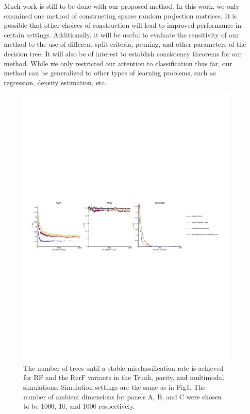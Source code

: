 \documentclass{article} %
\begin{document}
Much work is still to be done with our proposed method. In this work, we only examined one method of constructing sparse random projection matrices. It is possible that other choices of construction will lead to improved performance in certain settings. Additionally, it will be useful to evaluate the sensitivity of our method to the use of different split criteria, pruning, and other parameters of the decision tree. It will also be of interest to establish consistency theorems for our method. While we only restricted our attention to classification thus far, our method can be generalized to other types of learning problems, such as regression, density estimation, etc.




\appendix
\setcounter{figure}{0}
\renewcommand\thefigure{A\arabic{figure}}

\begin{figure}[h]
\begin{center}
\includegraphics[trim=0in 8in 0in 8in, clip=true, width=\linewidth]{../Figures/pdf/Fig0_nTrees}
\end{center}
\caption{The number of trees until a stable misclassification rate is achieved for RF and the RerF variants in the Trunk, parity, and multimodal simulations. Simulation settings are the same as in Fig1. The number of ambient dimensions for panels A, B, and C were chosen to be 1000, 10, and 1000 respectively.}
\label{fig:ntrees}
\end{figure}
\end{document}
